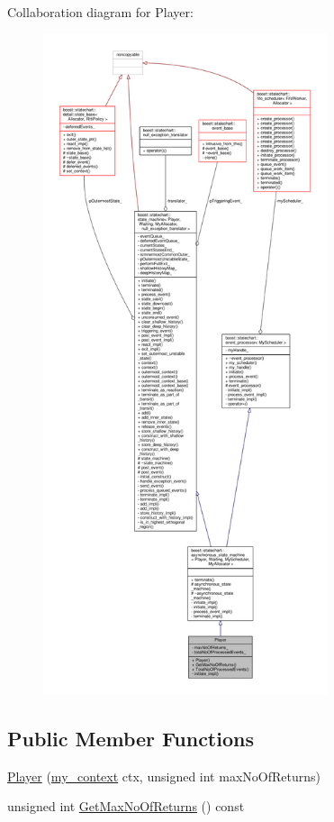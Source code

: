 Collaboration diagram for Player\+:
\nopagebreak
\begin{figure}[H]
\begin{center}
\leavevmode
\includegraphics[height=550pt]{struct_player__coll__graph}
\end{center}
\end{figure}
\subsection*{Public Member Functions}
\begin{DoxyCompactItemize}
\item 
\mbox{\hyperlink{struct_player_ac49e6a0d7a0f627228c3823c22aafe6b}{Player}} (\mbox{\hyperlink{classboost_1_1statechart_1_1event__processor_a99f1c6ec8419ec82f140c5c93c5eb8cd}{my\+\_\+context}} ctx, unsigned int max\+No\+Of\+Returns)
\item 
unsigned int \mbox{\hyperlink{struct_player_a9baaf8634e23c87bcd785a79793dbd37}{Get\+Max\+No\+Of\+Returns}} () const
\end{DoxyCompactItemize}
